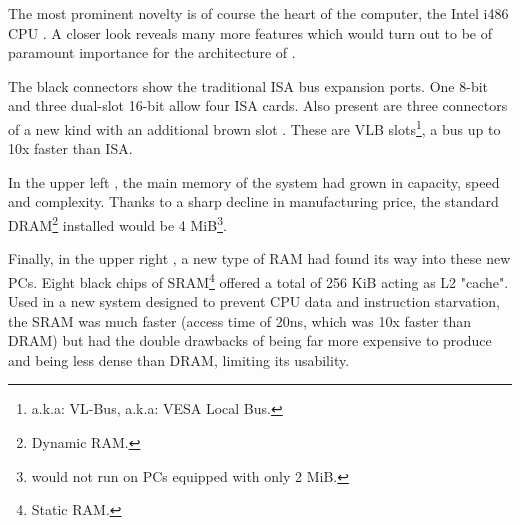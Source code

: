 \par
The most prominent novelty is of course the heart of the computer, the Intel i486 CPU . A closer look reveals many more features which would turn out to be of paramount importance for the architecture of \doom.\\
\par 
The black connectors show the traditional ISA bus expansion ports. One 8-bit  and three dual-slot 16-bit  allow four ISA cards. Also present are three connectors of a new kind with an additional brown slot . These are VLB slots\footnote{a.k.a: VL-Bus, a.k.a: VESA Local Bus.}, a bus up to 10x faster than ISA.

\par
In the upper left , the main memory of the system had grown in capacity, speed and complexity. Thanks to a sharp decline in manufacturing price, the standard DRAM\footnote{Dynamic RAM.} installed would be 4 MiB\footnote{\doom{} would not run on PCs equipped with only 2 MiB.}.\\
\par
 Finally, in the upper right , a new type of RAM had found its way into these new PCs. Eight black chips of SRAM\footnote{Static RAM.} offered a total of 256 KiB acting as L2 "cache". Used in a new system designed to prevent CPU data and instruction starvation, the SRAM was much faster (access time of 20ns, which was 10x faster than DRAM) but had the double drawbacks of being far more expensive to produce and being less dense than DRAM, limiting its usability.



